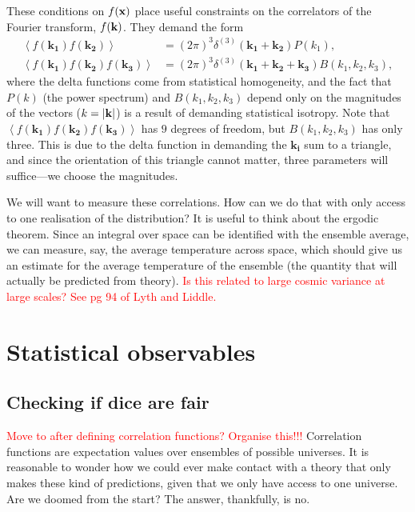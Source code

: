     These conditions on $f(\mathbf{x})$ place useful constraints on the correlators of the
    Fourier transform, $f(\mathbf{k})$. They demand the form
    \begin{align}\label{spectrum_definitions}
        \left<f(\mathbf{k_1})f(\mathbf{k_2})\right> &= (2\pi)^3\delta^{(3)}(\mathbf{k_1}+\mathbf{k_2})P(k_1),\\
        \left<f(\mathbf{k_1})f(\mathbf{k_2})f(\mathbf{k_3})\right> &= (2\pi)^3\delta^{(3)}(\mathbf{k_1}+\mathbf{k_2}+\mathbf{k_3})B(k_1,k_2,k_3),
    \end{align}
    where the delta functions come from statistical homogeneity, and the fact that $P(k)$ (the power spectrum)
    and $B(k_1,k_2,k_3)$ depend only on the magnitudes of the vectors ($k=\left|\mathbf{k}\right|$) is a result
    of demanding statistical isotropy. Note that $\left<f(\mathbf{k_1})f(\mathbf{k_2})f(\mathbf{k_3})\right>$
    has $9$ degrees of freedom, but $B(k_1,k_2,k_3)$ has only three. This is due to the delta function in
    demanding the $\mathbf{k_i}$ sum to a triangle, and since the orientation of this triangle cannot matter,
    three parameters will suffice---we choose the magnitudes.


    We will want to measure these correlations. How can we do that with only access to one realisation
    of the distribution? It is useful to think about the ergodic theorem. Since an integral over
    space can be identified with the ensemble average, we can measure, say, the average temperature
    across space, which should give us an estimate for the average temperature of the ensemble
    (the quantity that will actually be predicted from theory).
    \textcolor{red}{Is this related to large cosmic variance at large scales? See pg 94 of Lyth and Liddle.}


\section{Statistical observables}
    \subsection{Checking if dice are fair}
\textcolor{red}{Move to after defining correlation functions?}
\textcolor{red}{Organise this!!!}
Correlation functions are expectation values over ensembles of possible
universes. It is reasonable to wonder how we could ever make contact with a theory
that only makes these kind of predictions, given that we only have access to one universe.
Are we doomed from the start? The answer, thankfully, is no.


